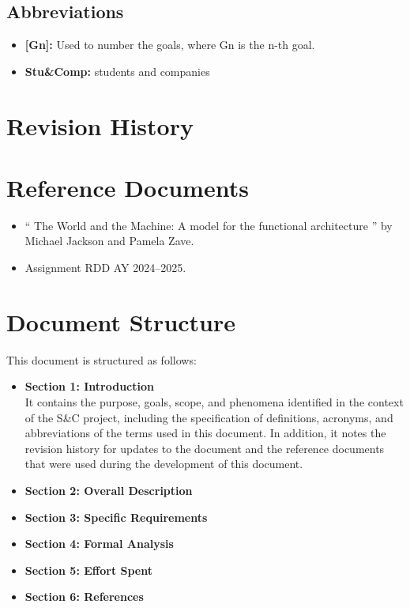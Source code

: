 \subsection{Abbreviations}
\label{subsec:abbreviations}
\begin{itemize}
    \item \textbf{[Gn]:} Used to number the goals, where Gn is the n-th goal.
    \item \textbf{Stu\&Comp:} students and companies
\end{itemize}

\section{Revision History}
\label{sec:revisionhistory}

\label{sec:revision}

\section{Reference Documents}
\label{sec:reference}
\begin{itemize}
    \item `` The World and the Machine: A model for the functional architecture '' by Michael Jackson and Pamela Zave.
    \item Assignment RDD AY 2024–2025.
\end{itemize}

\section{Document Structure}
\label{sec:structure}
This document is structured as follows:
\begin{itemize}
    \item \textbf{Section 1: Introduction} 
    \\It contains the purpose, goals, scope, and phenomena identified in the context of the S\&C project, 
    including the specification of definitions, acronyms, and abbreviations of the terms used in this document. In addition, it notes the revision 
    history for updates to the document and the reference documents that were used during the development of this document.
    \item \textbf{Section 2: Overall Description}
    \item \textbf{Section 3: Specific Requirements}
    \item \textbf{Section 4: Formal Analysis}
    \item \textbf{Section 5: Effort Spent}
    \item \textbf{Section 6: References}
\end{itemize}